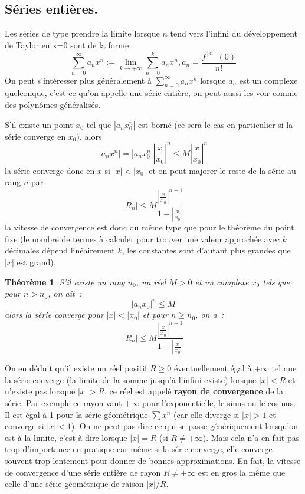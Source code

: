 \documentclass[a4paper,11pt]{article}
\newtheorem{thm}{Théorème}
\begin{document}
\subsection{Séries entières.}
Les séries de type prendre la limite lorsque $n$ tend vers
l'infini du développement de Taylor en x=0 sont de la forme
\[ \sum_{n=0}^\infty a_n x^n := \lim_{ k \rightarrow +\infty} 
\sum_{n=0}^k a_n x^n, a_n=\frac{f^{[n]}(0)}{n!}
\]
On peut s'intéresser plus généralement à $\sum_{n=0}^\infty a_n x^n$
lorsque $a_n$ est un complexe quelconque, 
c'est ce qu'on appelle une série entière, on peut aussi les voir comme
des polynômes généralisés. 

S'il existe un point $x_0$ tel que 
$|a_n x_0^n|$ est born\'e (ce sera le cas en particulier 
si la s\'erie converge en $x_0$), alors
\[ |a_n x^n| = |a_n x_0^n| |\frac{x}{x_0}|^n \leq 
M |\frac{x}{x_0}|^n
\]
la s\'erie converge donc en $x$ si $|x|<|x_0|$ et on 
peut majorer le reste de la s\'erie au rang $n$ par 
\[ |R_n| \leq M \frac{ |\frac{x}{x_0}|^{n+1}} {1-|\frac{x}{x_0}|} 
\]
la vitesse de convergence est donc du m\^eme type que pour le
th\'eor\`eme du point fixe (le nombre de termes \`a calculer
pour trouver une valeur approch\'ee avec $k$ d\'ecimales 
d\'epend lin\'eairement $k$, les constantes sont d'autant
plus grandes que $|x|$ est grand).

\begin{thm}
S'il existe un rang $n_0$, un r\'eel $M>0$ et un complexe $x_0$ tels que 
pour $n>n_0$, on ait~:
\[ |a_n x_0|^n \leq M\]
alors la s\'erie converge pour $|x|<|x_0|$
et pour $n\geq n_0$, on a~:
\begin{equation} \label{eq:maj_serie_entiere}
|R_n| \leq M \frac{ |\frac{x}{x_0}|^{n+1}} {1-|\frac{x}{x_0}|} 
\end{equation}
\end{thm}

On en d\'eduit qu'il existe un réel
positif $R\geq 0$ éventuellement égal à $+\infty$ tel que 
la s\'erie converge (la limite de la somme jusqu'\`a l'infini existe) 
lorsque $|x|<R$ et n'existe pas lorsque
$|x|>R$, ce réel est appelé {\bf rayon de convergence} de la série.
Par exemple ce rayon vaut $+\infty$ pour l'exponentielle, le sinus
ou le cosinus. Il
est égal à 1 pour la série géométrique $\sum x^n$ (car elle diverge
si $|x|>1$ et converge si $|x|<1$). 
On ne peut pas dire ce qui se passe g\'en\'eriquement lorsqu'on
est \`a la limite, c'est-\`a-dire lorsque $|x|=R$ (si $R\neq
+\infty$). Mais cela n'a en fait pas trop d'importance en pratique
car m\^eme si la s\'erie converge, elle converge souvent trop lentement
pour donner de bonnes approximations. En fait, la vitesse de
convergence d'une s\'erie enti\`ere de rayon $R\neq +\infty$ est
en gros la m\^eme que celle d'une s\'erie g\'eom\'etrique de raison $|x|/R$.
\end{document}

